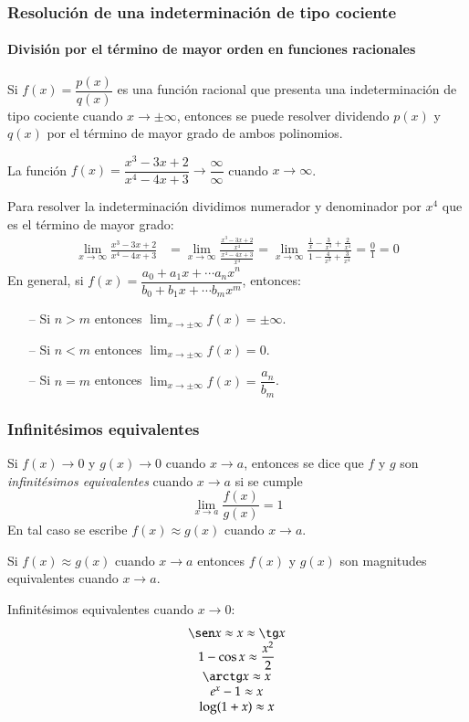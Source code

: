 \begin{frame}
\frametitle{Resolución de una indeterminación de tipo cociente}
\framesubtitle{División por el término de mayor orden en funciones racionales}
Si $f(x)=\dfrac{p(x)}{q(x)}$ es una función racional que presenta una indeterminación de tipo cociente cuando $x\rightarrow \pm\infty$, entonces se puede resolver dividendo $p(x)$ y $q(x)$ por el término de mayor grado de ambos polinomios.

 La función $f(x)=\dfrac{x^3-3x+2}{x^4-4x+3}\rightarrow \dfrac{\infty}{\infty}$ cuando $x\rightarrow \infty$.

Para resolver la indeterminación dividimos numerador y denominador por $x^4$ que es el término de mayor grado:
\begin{align*}
\lim_{x\rightarrow \infty}\frac{x^3-3x+2}{x^4-4x+3} &=
\lim_{x\rightarrow \infty}\frac{\frac{x^3-3x+2}{x^4}}{\frac{x^4-4x+3}{x^4}} =
\lim_{x\rightarrow \infty}\frac{\frac{1}{x}-\frac{3}{x^3}+\frac{2}{x^4}}{1-\frac{4}{x^3}+\frac{3}{x^4}} =\frac{0}{1}=0
\end{align*}
En general, si $f(x)=\dfrac{a_0+a_1x+\cdots a_nx^n}{b_0+b_1x+\cdots b_mx^m}$, entonces:
\begin{itemize}
\item[--] Si $n>m$ entonces $\lim_{x\rightarrow \pm \infty}f(x)=\pm\infty$.
\item[--] Si $n<m$ entonces $\lim_{x\rightarrow \pm \infty}f(x)=0$.
\item[--] Si $n=m$ entonces $\lim_{x\rightarrow \pm \infty}f(x)=\dfrac{a_n}{b_m}$.
\end{itemize}
\end{frame}


\begin{frame}
\frametitle{Infinitésimos equivalentes}
\begin{definicion}
Si $f(x)\rightarrow 0$ y $g(x)\rightarrow 0$ cuando $x\rightarrow a$, entonces se dice que $f$ y $g$ son \emph{infinitésimos equivalentes} cuando $x\rightarrow a$ si se cumple
\[
\lim_{x\rightarrow a}\frac{f(x)}{g(x)}=1
\]
En tal caso se escribe $f(x)\approx g(x)$ cuando $x\rightarrow a$.
\end{definicion}

Si $f(x)\approx g(x)$ cuando $x\rightarrow a$ entonces $f(x)$ y $g(x)$ son magnitudes equivalentes cuando $x\rightarrow a$.

Infinitésimos equivalentes cuando $x\rightarrow 0$:
\[
\begin{array}{c}
\sen x \approx x \approx \tg x\\
1-\cos x \approx \dfrac{x^2}{2}\\
\arctg x \approx x\\
e^x-1 \approx x\\
\log(1+x) \approx x\\
\end{array}
\]
\end{frame}


